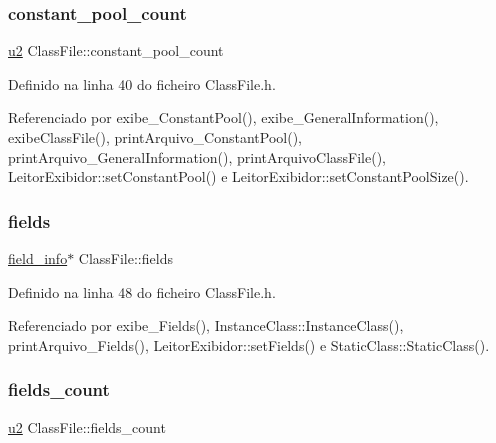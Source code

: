 \mbox{\label{classClassFile_ac8fdf5cccfd632da4fdb21ae63fffa7a}} 
\subsubsection{\texorpdfstring{constant\+\_\+pool\+\_\+count}{constant\_pool\_count}}
{\footnotesize\ttfamily \hyperlink{BasicTypes_8h_a732cde1300aafb73b0ea6c2558a7a54f}{u2} Class\+File\+::constant\+\_\+pool\+\_\+count}



Definido na linha 40 do ficheiro Class\+File.\+h.



Referenciado por exibe\+\_\+\+Constant\+Pool(), exibe\+\_\+\+General\+Information(), exibe\+Class\+File(), print\+Arquivo\+\_\+\+Constant\+Pool(), print\+Arquivo\+\_\+\+General\+Information(), print\+Arquivo\+Class\+File(), Leitor\+Exibidor\+::set\+Constant\+Pool() e Leitor\+Exibidor\+::set\+Constant\+Pool\+Size().

\mbox{\label{classClassFile_aa324f88c75aa96c632f8c57d010aab0c}} 
\subsubsection{\texorpdfstring{fields}{fields}}
{\footnotesize\ttfamily \hyperlink{structfield__info}{field\+\_\+info}$\ast$ Class\+File\+::fields}



Definido na linha 48 do ficheiro Class\+File.\+h.



Referenciado por exibe\+\_\+\+Fields(), Instance\+Class\+::\+Instance\+Class(), print\+Arquivo\+\_\+\+Fields(), Leitor\+Exibidor\+::set\+Fields() e Static\+Class\+::\+Static\+Class().

\mbox{\label{classClassFile_acea207ee523fbc16611d3cf436c390e0}} 
\subsubsection{\texorpdfstring{fields\+\_\+count}{fields\_count}}
{\footnotesize\ttfamily \hyperlink{BasicTypes_8h_a732cde1300aafb73b0ea6c2558a7a54f}{u2} Class\+File\+::fields\+\_\+count}



